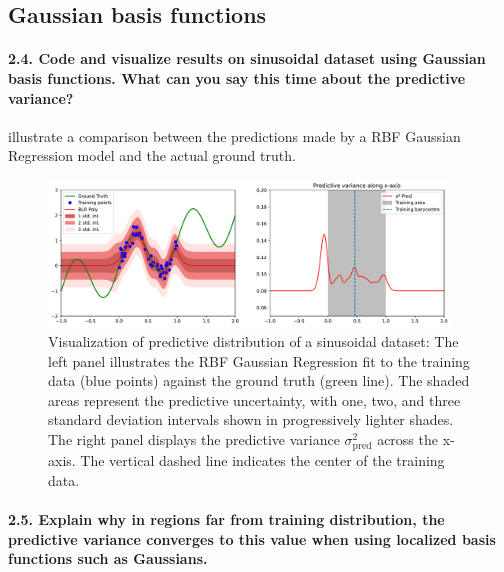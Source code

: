 \subsection{Gaussian basis functions}

\paragraph*{2.4. Code and visualize results on sinusoidal dataset using Gaussian basis functions. What can you say this time about the predictive variance?}

 illustrate a comparison between the predictions made by a RBF Gaussian Regression model and the actual ground truth. 


\begin{figure}[H]
    \centering
    \includegraphics[width=0.95\textwidth]{phi_gaussian.pdf}
    \caption{Visualization of predictive distribution of a sinusoidal dataset: The left panel illustrates the RBF Gaussian Regression fit to the training data (blue points) against the ground truth (green line). The shaded areas represent the predictive uncertainty, with one, two, and three standard deviation intervals shown in progressively lighter shades. The right panel displays the predictive variance $\sigma^2_{\text{pred}}$ across the x-axis. The vertical dashed line indicates the center of the training data.}
    \label{fig:phi_gaussian}
\end{figure}

\paragraph*{2.5. Explain why in regions far from training distribution, the predictive variance converges to this value when using localized basis functions such as Gaussians.}


